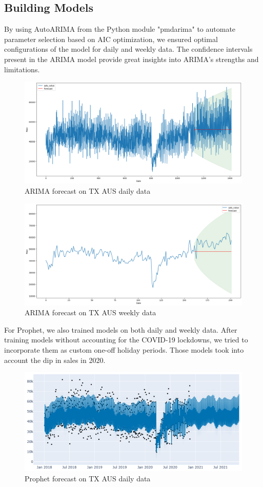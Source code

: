\documentclass{article}
\begin{document}
    \subsection{Building Models}
        By using AutoARIMA from the Python module "pmdarima" to automate parameter selection based on
        AIC optimization, we ensured optimal configurations of the model for daily and weekly data.
        The confidence intervals present in the ARIMA model provide great insights into ARIMA's 
        strengths and limitations.
        \begin{figure}[H]
            \centering
            \includegraphics[width=0.85\linewidth]{assets/ARIMA-Daily.png}
            \caption{ARIMA forecast on TX AUS daily data}
            \label{fig:ARIMA-Daily}
        \end{figure}
        \begin{figure}[H]
            \centering
            \includegraphics[width=0.85\linewidth]{assets/ARIMA-Weekly.png}
            \caption{ARIMA forecast on TX AUS weekly data}
            \label{fig:ARIMA-Weekly}
        \end{figure}
        For Prophet, we also trained models on both daily and weekly data. After training models 
        without accounting for the COVID-19 lockdowns, we tried to incorporate them as custom
        one-off holiday periods. Those models took into account the dip in sales in 2020.
        \begin{figure}[H]
            \centering
            \includegraphics[width=0.85\linewidth]{assets/Prophet-Daily.png}
            \caption{Prophet forecast on TX AUS daily data}
            \label{fig:Prophet-Daily}
        \end{figure}
\end{document}
